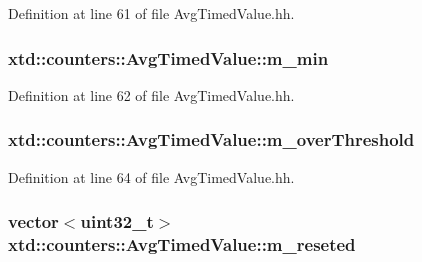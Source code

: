 Definition at line 61 of file Avg\+Timed\+Value.\+hh.

\subsubsection[{\texorpdfstring{m\+\_\+min}{m_min}}]{ xtd\+::counters\+::\+Avg\+Timed\+Value\+::m\+\_\+min}\hypertarget{classxtd_1_1counters_1_1AvgTimedValue_aeed066e7062c73d577033308bc0344bf}{}\label{classxtd_1_1counters_1_1AvgTimedValue_aeed066e7062c73d577033308bc0344bf}


Definition at line 62 of file Avg\+Timed\+Value.\+hh.

\subsubsection[{\texorpdfstring{m\+\_\+over\+Threshold}{m_overThreshold}}]{ xtd\+::counters\+::\+Avg\+Timed\+Value\+::m\+\_\+over\+Threshold}\hypertarget{classxtd_1_1counters_1_1AvgTimedValue_a7a91ad83dade8f67c4df8150ddb33060}{}\label{classxtd_1_1counters_1_1AvgTimedValue_a7a91ad83dade8f67c4df8150ddb33060}


Definition at line 64 of file Avg\+Timed\+Value.\+hh.

\subsubsection[{\texorpdfstring{m\+\_\+reseted}{m_reseted}}]{\setlength{\rightskip}{0pt plus 5cm}vector$<$uint32\+\_\+t$>$ xtd\+::counters\+::\+Avg\+Timed\+Value\+::m\+\_\+reseted}\hypertarget{classxtd_1_1counters_1_1AvgTimedValue_a9f3477cd3eb3fb75f2ba8d75d706eb88}{}\label{classxtd_1_1counters_1_1AvgTimedValue_a9f3477cd3eb3fb75f2ba8d75d706eb88}


